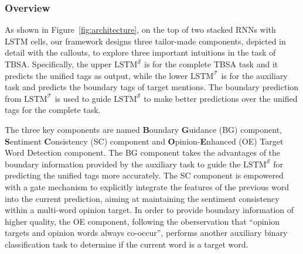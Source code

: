 \documentclass[letterpaper]{article}
\begin{document}
\subsubsection{Overview}
As shown in Figure~\ref{fig:architecture}, on the top of two stacked RNNs with LSTM cells, our framework designs three tailor-made components, depicted in detail with the callouts, to explore three important intuitions in the task of TBSA.
Specifically, the upper $\text{LSTM}^{\mathcal{S}}$ is for the complete TBSA task and it predicts the unified tags as output, while the lower $\text{LSTM}^{\mathcal{T}}$ is for the auxiliary task and predicts the boundary tags of target mentions. The boundary prediction from $\text{LSTM}^{\mathcal{T}}$ is used to guide $\text{LSTM}^{\mathcal{S}}$ to make better predictions over the unified tags for the complete task.


The three key components are named \textbf{B}oundary \textbf{G}uidance (BG) component, \textbf{S}entiment \textbf{C}onsistency (SC) component and \textbf{O}pinion-\textbf{E}nhanced (OE) Target Word Detection component. The BG component takes the advantages of the boundary information provided by the auxiliary task to guide the $\text{LSTM}^{\mathcal{S}}$ for predicting the unified tags more accurately. The SC component is empowered with a gate mechanism to explicitly integrate the features of the previous word into the current prediction, aiming at maintaining the sentiment consistency within a multi-word opinion target. In order to provide boundary information of higher quality, the OE component, following the oberservation that ``opinion targets and opinion words always co-occur'', performs another auxiliary binary classification task to determine if the current word is a target word.
\end{document}
